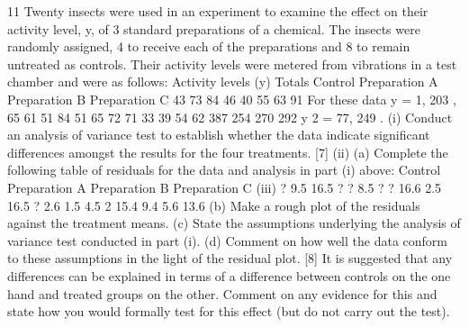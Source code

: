 \documentclass[a4paper,12pt]{article}
\begin{document}
\begin{enumerate}
11
Twenty insects were used in an experiment to examine the effect on their activity
level, y, of 3 standard preparations of a chemical. The insects were randomly
assigned, 4 to receive each of the preparations and 8 to remain untreated as controls.
Their activity levels were metered from vibrations in a test chamber and were as
follows:
Activity levels (y)
Totals
Control
Preparation A
Preparation B
Preparation C 43
73
84
46
40
55
63
91
For these data y = 1, 203 ,
65
61
51
84
51
65
72
71
33
39
54
62
387
254
270
292
y 2 = 77, 249 .
(i) Conduct an analysis of variance test to establish whether the data indicate
significant differences amongst the results for the four treatments.
[7]
(ii) (a)
Complete the following table of residuals for the data and analysis in
part (i) above:
Control
Preparation A
Preparation B
Preparation C
(iii)
?
9.5
16.5
?
?
8.5
?
?
16.6
2.5
16.5
?
2.6
1.5
4.5
2
15.4
9.4
5.6 13.6
(b) Make a rough plot of the residuals against the treatment means.
(c) State the assumptions underlying the analysis of variance test
conducted in part (i).
(d) Comment on how well the data conform to these assumptions in the
light of the residual plot.
[8]
It is suggested that any differences can be explained in terms of a difference
between controls on the one hand and treated groups on the other.
Comment on any evidence for this and state how you would formally test for
this effect (but do not carry out the test).


\end{enumerate}
\end{document}
